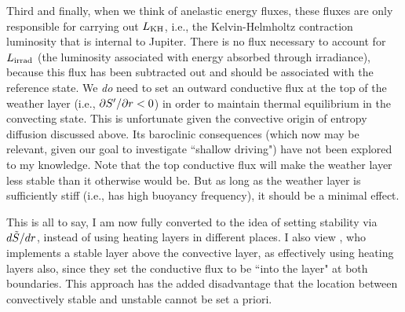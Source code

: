 \documentclass[12pt]{article}
\numberwithin{equation}{section}
\newcommand{\lumirrad}{L_{\rm irrad}}
\newcommand{\lumkh}{L_{\rm KH}}
\begin{document}
Third and finally, when we think of anelastic energy fluxes, these fluxes are only responsible for carrying out $\lumkh$, i.e., the Kelvin-Helmholtz contraction luminosity that is internal to Jupiter. There is no flux necessary to account for $\lumirrad$ (the luminosity associated with energy absorbed through irradiance), because this flux has been subtracted out and should be associated with the reference state. We \textit{do} need to set an outward conductive flux at the top of the weather layer (i.e., $\partial{S^\prime}/\partial r<0$) in order to maintain thermal equilibrium in the convecting state. This is unfortunate given the convective origin of entropy diffusion discussed above. Its baroclinic consequences (which now may be relevant, given our goal to investigate ``shallow driving") have not been explored to my knowledge. Note that the top conductive flux will make the weather layer less stable than it otherwise would be. But as long as the weather layer is sufficiently stiff (i.e., has high buoyancy frequency), it should be a minimal effect. 

This is all to say, I am now fully converted to the idea of setting stability via $d\tilde{S}/dr$, instead of using heating layers in different places. I also view \citet{Heimpel2022}, who implements a stable layer above the convective layer, as effectively using heating layers also, since they set the conductive flux to be ``into the layer" at both boundaries. This approach has the added disadvantage that the location between convectively stable and unstable cannot be set a priori. 






\end{document}
